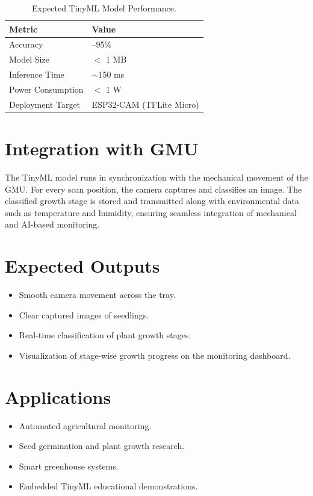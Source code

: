 \documentclass[../main]{subfiles}
\begin{document}
\begin{table}[H]
    \centering
    \begin{tabularx} {\textwidth} {
            >{\raggedright \arraybackslash}X
            >{\raggedright \arraybackslash}X
        }
        \toprule
        \textbf{Metric} & \textbf{Value} \\ \midrule
        Accuracy & 92–95\% \\
        Model Size & $<$ 1 MB \\
        Inference Time & $\sim$150 ms \\
        Power Consumption & $<$ 1 W \\
        Deployment Target & ESP32-CAM (TFLite Micro) \\
        \bottomrule
    \end{tabularx}
    \caption{Expected TinyML Model Performance.}
\end{table}

\section{Integration with GMU}
The TinyML model runs in synchronization with the mechanical movement of the GMU. For every scan position, the camera captures and classifies an image. The classified growth stage is stored and transmitted along with environmental data such as temperature and humidity, ensuring seamless integration of mechanical and AI-based monitoring.

\section{Expected Outputs}
\begin{itemize}
    \item Smooth camera movement across the tray.
    \item Clear captured images of seedlings.
    \item Real-time classification of plant growth stages.
    \item Visualization of stage-wise growth progress on the monitoring dashboard.
\end{itemize}

\section{Applications}
\begin{itemize}
    \item Automated agricultural monitoring.
    \item Seed germination and plant growth research.
    \item Smart greenhouse systems.
    \item Embedded TinyML educational demonstrations.
\end{itemize}
\end{document}
